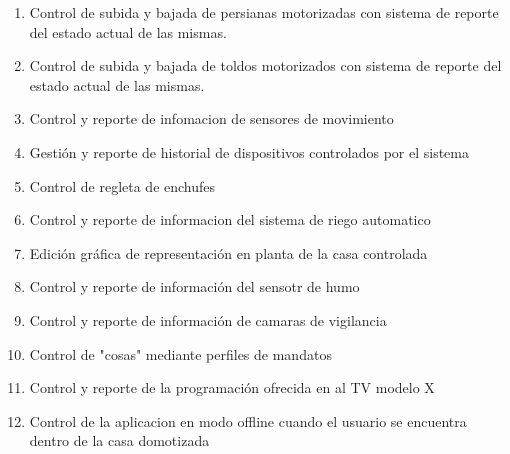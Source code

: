 \begin{enumerate}
            \item Control de subida y bajada de persianas motorizadas con sistema de reporte del estado actual de las mismas.

            \item Control de subida y bajada de toldos motorizados con sistema de reporte del estado actual de las mismas.

            \item Control  y reporte de infomacion de sensores de movimiento

            \item Gestión y reporte de historial de dispositivos controlados por el sistema

            \item Control de regleta  de enchufes

            \item Control y reporte de informacion del sistema de riego automatico

            \item Edición gráfica de representación en planta de la casa controlada

            \item Control y reporte de información del sensotr de humo

            \item Control y reporte de información de camaras de vigilancia

            \item Control de "cosas" mediante perfiles de mandatos

            \item Control y reporte de la programación ofrecida en al TV modelo X

            \item Control de la aplicacion en modo offline cuando el usuario se encuentra dentro de la casa domotizada

    \end{enumerate}

